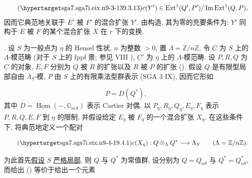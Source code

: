 \begin{equation}\tag{\SGARefTarget{sga7.sga7i.eix.n9-3-13}{9.3.13}}
c(Y')\in
\operatorname{Ext}^1(Q',P')/
\operatorname{Im}\operatorname{Ext}^1(Q,P),
\end{equation}
因而它典范地关联于 $E'$ 被 $F'$ 的混合扩张 $Y'$. 由构造, 其为零的充要条件为: $Y'$ 同构于 $E$ 被 $F$ 的某个混合扩张 $X$ 在 $r$ 下的变换.



\medskip
\noindent
{}. 设 $S$ 为一般点为 $\eta$ 的 Hensel 性状, $n$ 为整数 $>0$, 置 $\Lambda=\mathbb Z/n\mathbb Z$, 令 $\underline C$ 为 $S$ 上的 $\Lambda$-模范畴 (对于 $S$ 上的 fppf 景; 参见 VIII ), $\underline C'$ 为 $\eta$ 上的 $\Lambda$-模范畴. 设 $P,R,Q$ 为 $\underline C$ 的对象, $E,F$ 分别为 $Q$ 被 $R$ 的扩张以及 $R$ 被 $P$ 的扩张 (). 假设 $Q$ 是有限型局部自由 $\Lambda_S$-模, $P$ 由 $S$ 上的有限乘法型群表示 (SGA 3 IX), 因而它形如

\begin{equation*}
P=D(Q^*),
\end{equation*}
其中 $D=\underline{\operatorname{Hom}}(-,\mathbb G_{mS})$ 表示 Cartier 对偶. 以 $P_\eta,R_\eta,Q_\eta,E_\eta,F_\eta$ 表示 $P,R,Q,E,F$ 到 $\eta$ 的限制, 并假设给定 $E_\eta$ 被 $F_\eta$ 的一个混合扩张 $X_\eta$. 在这些条件下, 将典范地定义一个配对

\begin{equation}\tag{\SGARefTarget{sga7.sga7i.eix.n9-4-1}{9.4.1}}
c(X_\eta):Q\otimes_\Lambda Q^*\longrightarrow\Lambda_S
\qquad(\Lambda=\mathbb Z/n\mathbb Z).
\end{equation}

为此首先\underline{假设} $S$ \underline{严格局部}. 则 $Q$ 与 $Q^*$ 为常值群, 设分别为 $Q=Q_{oS}$ 与 $Q^*=Q^*_{oS}$, 而给出 () 等价于给出一个元素

